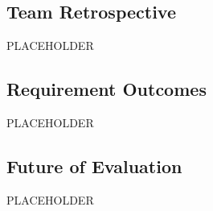\subsection*{Team Retrospective}
PLACEHOLDER

\smallskip\subsection*{Requirement Outcomes}
PLACEHOLDER

\smallskip\subsection*{Future of Evaluation}
PLACEHOLDER